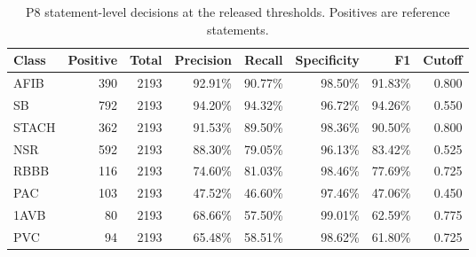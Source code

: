 \begin{table}[tbp]
\caption{P8 statement-level decisions at the released thresholds. Positives are reference statements.\label{tab:p8class}}
\centering\small
\begin{tabular}{lrrrrrrr}
\toprule
Class & Positive & Total & Precision & Recall & Specificity & F1 & Cutoff \\
\midrule
AFIB & 390 & 2193 & 92.91\% & 90.77\% & 98.50\% & 91.83\% & 0.800 \\
SB & 792 & 2193 & 94.20\% & 94.32\% & 96.72\% & 94.26\% & 0.550 \\
STACH & 362 & 2193 & 91.53\% & 89.50\% & 98.36\% & 90.50\% & 0.800 \\
NSR & 592 & 2193 & 88.30\% & 79.05\% & 96.13\% & 83.42\% & 0.525 \\
RBBB & 116 & 2193 & 74.60\% & 81.03\% & 98.46\% & 77.69\% & 0.725 \\
PAC & 103 & 2193 & 47.52\% & 46.60\% & 97.46\% & 47.06\% & 0.450 \\
1AVB & 80 & 2193 & 68.66\% & 57.50\% & 99.01\% & 62.59\% & 0.775 \\
PVC & 94 & 2193 & 65.48\% & 58.51\% & 98.62\% & 61.80\% & 0.725 \\
\bottomrule
\end{tabular}
\end{table}